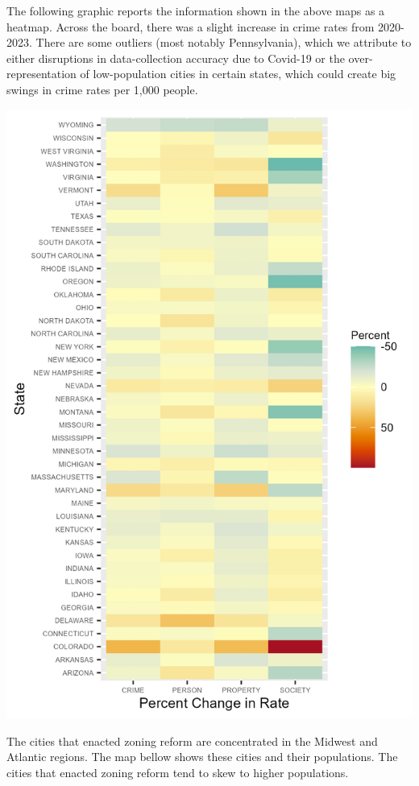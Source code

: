 \documentclass[
  12pt,
]{article}
\begin{document}
The following graphic reports the information shown in the above maps as
a heatmap. Across the board, there was a slight increase in crime rates
from 2020-2023. There are some outliers (most notably Pennsylvania),
which we attribute to either disruptions in data-collection accuracy due
to Covid-19 or the over-representation of low-population cities in
certain states, which could create big swings in crime rates per 1,000
people.

\includegraphics{Plots/States_heat.png}

The cities that enacted zoning reform are concentrated in the Midwest
and Atlantic regions. The map bellow shows these cities and their
populations. The cities that enacted zoning reform tend to skew to
higher populations.
\end{document}
